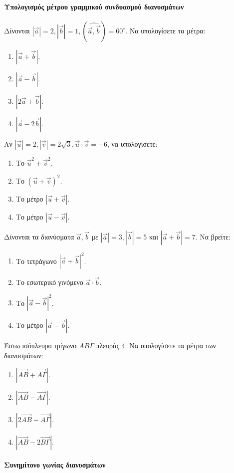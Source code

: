 \documentclass[11pt,a4paper,modern]{FFExercises}
\begin{document}
\paragraph{Υπολογισμός μέτρου γραμμικού συνδυασμού διανυσμάτων}

\askhsh
Δίνονται $|\vec{a}|=2, |\vec{b}|=1, (\widehat{\vec{a},\vec{b}})=60^\circ$. Να υπολογίσετε τα μέτρα:
\begin{enumerate}
    \item $|\vec{a}+\vec{b}|$.
    \item $|\vec{a}-\vec{b}|$.
    \item $|2\vec{a}+\vec{b}|$.
    \item $|\vec{a}-2\vec{b}|$.
\end{enumerate}

\askhsh
Αν $|\vec{u}|=2, |\vec{v}|=2\sqrt{3}, \vec{u}\cdot\vec{v}=-6$, να υπολογίσετε:
\begin{enumerate}
    \item Το $\vec{u}^2 + \vec{v}^2$.
    \item Το $(\vec{u}+\vec{v})^2$.
    \item Το μέτρο $|\vec{u}+\vec{v}|$.
    \item Το μέτρο $|\vec{u}-\vec{v}|$.
\end{enumerate}

\askhsh
Δίνονται τα διανύσματα $\vec{a}, \vec{b}$ με $|\vec{a}|=3, |\vec{b}|=5$ και $|\vec{a}+\vec{b}|=7$. Να βρείτε:
\begin{enumerate}
    \item Το τετράγωνο $|\vec{a}+\vec{b}|^2$.
    \item Το εσωτερικό γινόμενο $\vec{a}\cdot\vec{b}$.
    \item Το $|\vec{a}-\vec{b}|^2$.
    \item Το μέτρο $|\vec{a}-\vec{b}|$.
\end{enumerate}

\askhsh
Έστω ισόπλευρο τρίγωνο $AB\Gamma$ πλευράς 4. Να υπολογίσετε τα μέτρα των διανυσμάτων:
\begin{enumerate}
    \item $|\vec{AB}+\vec{A\Gamma}|$.
    \item $|\vec{AB}-\vec{A\Gamma}|$.
    \item $|2\vec{AB}-\vec{A\Gamma}|$.
    \item $|\vec{AB}-2\vec{B\Gamma}|$.
\end{enumerate}

\paragraph{Συνημίτονο γωνίας διανυσμάτων}
\end{document}
